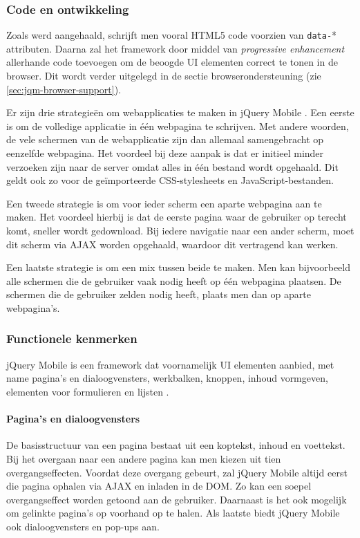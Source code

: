 \subsubsection{Code en ontwikkeling}
Zoals werd aangehaald, schrijft men vooral HTML5 code voorzien van \texttt{data-}* attributen. Daarna zal het framework door middel van \emph{progressive enhancement} allerhande code toevoegen om de beoogde UI elementen correct te tonen in de browser. Dit wordt verder uitgelegd in de sectie browserondersteuning (zie \ref{sec:jqm-browser-support}).

Er zijn drie strategieën om webapplicaties te maken in jQuery Mobile \cite{Broulik2012}. Een eerste is om de volledige applicatie in één webpagina te schrijven. Met andere woorden,  de vele schermen van de webapplicatie zijn dan allemaal samengebracht op eenzelfde webpagina. Het voordeel bij deze aanpak is dat er initieel minder verzoeken zijn naar de server omdat alles in één bestand wordt opgehaald. Dit geldt ook zo voor de geïmporteerde CSS-stylesheets en JavaScript-bestanden. 

Een tweede strategie is om voor ieder scherm een aparte webpagina aan te maken. Het voordeel hierbij is dat de eerste pagina waar de gebruiker op terecht komt, sneller wordt gedownload. Bij iedere navigatie naar een ander scherm, moet dit scherm via AJAX worden opgehaald, waardoor dit vertragend kan werken. 

Een laatste strategie is om een mix tussen beide te maken. Men kan bijvoorbeeld alle schermen die de gebruiker vaak nodig heeft op één webpagina plaatsen. De schermen die de gebruiker zelden nodig heeft, plaats men dan op aparte webpagina's.  

\subsubsection{Functionele kenmerken}
jQuery Mobile is een framework dat voornamelijk UI elementen aanbied, met name pagina's en dialoogvensters, werkbalken, knoppen, inhoud vormgeven, elementen voor formulieren en lijsten \cite{JQuery2012b}.

\paragraph{Pagina's en dialoogvensters}
De basisstructuur van een pagina bestaat uit een koptekst, inhoud en voettekst. Bij het overgaan naar een andere pagina kan men kiezen uit tien overgangseffecten. Voordat deze overgang gebeurt, zal jQuery Mobile altijd eerst die pagina ophalen via AJAX en inladen in de DOM. Zo kan een soepel overgangseffect worden getoond aan de gebruiker. Daarnaast is het ook mogelijk om gelinkte pagina's op voorhand op te halen. Als laatste biedt jQuery Mobile ook dialoogvensters en pop-ups aan. 

